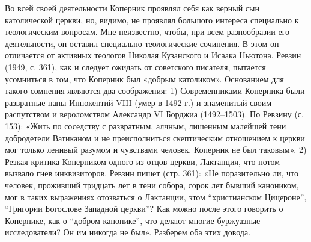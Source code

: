 Во  всей своей  деятельности  Коперник проявлял  себя  как верный  сын
католической  церкви,  но,  видимо,   не  проявлял  большого  интереса
специально к  теологическим вопросам. Мне неизвестно,  чтобы, при всем
разнообразии  его деятельности,  он  оставил специально  теологические
сочинения.  В   этом  он  отличается  от   активных  теологов  Николая
Кузанского  и Исаака  Ньютона. Ревзин  (1949, с.  361), как  и следует
ожидать  от  советского  писателя,  пытается  усомниться  в  том,  что
Коперник  был  «добрым  католиком».  Основанием  для  такого  сомнения
являются два соображения: 1)  Современниками Коперника были развратные
папы Иннокентий VIII (умер в 1492 г.) и знаменитый своим распутством и
вероломством Александр  VI Борджиа (1492--1503). По  Ревзину (с. 153):
«Жить  по  соседству  с  развратным, алчным,  лишенным  малейшей  тени
добродетели Ватиканом  и не  преисполниться скептическим  отношением к
церкви мог только ленивый разумом и чувствами человек. Коперник не был
таковым».  2)  Резкая  критика  Коперником  одного  из  отцов  церкви,
Лактанция,  что потом  вызвало гнев  инквизиторов. Ревзин  пишет (стр.
361): «Не поразительно ли, что  человек, проживший тридцать лет в тени
собора, сорок лет бывший каноником,  мог в таких выражениях отозваться
о  Лактанции,  этом  ``христианском Цицероне'',  ``Григории  Богослове
Западной церкви''? Как  можно после этого говорить о  Копернике, как о
``добром канонике'', что делают многие буржуазные исследователи? Он им
никогда не был». Разберем оба этих довода.

